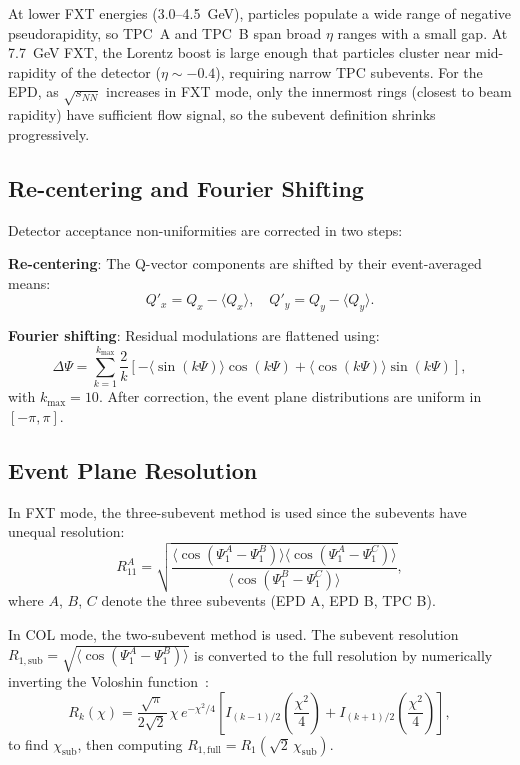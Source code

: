 \documentclass[aps,prc,preprint,superscriptaddress,nofootinbib]{revtex4-2}
\begin{document}
At lower FXT energies (3.0--4.5~GeV), particles populate a wide range of negative pseudorapidity, so TPC~A and TPC~B span broad $\eta$ ranges with a small gap. At 7.7~GeV FXT, the Lorentz boost is large enough that particles cluster near mid-rapidity of the detector ($\eta \sim -0.4$), requiring narrow TPC subevents. For the EPD, as $\sqrt{s_{NN}}$ increases in FXT mode, only the innermost rings (closest to beam rapidity) have sufficient flow signal, so the subevent definition shrinks progressively.

\subsection{Re-centering and Fourier Shifting}
\label{subsec:corrections}

Detector acceptance non-uniformities are corrected in two steps:

\textbf{Re-centering}: The Q-vector components are shifted by their event-averaged means:
\begin{equation}
    Q'_{x} = Q_x - \langle Q_x \rangle, \quad Q'_{y} = Q_y - \langle Q_y \rangle.
\end{equation}

\textbf{Fourier shifting}: Residual modulations are flattened using:
\begin{equation}
    \Delta\Psi = \sum_{k=1}^{k_{\max}} \frac{2}{k} \left[-\langle\sin(k\Psi)\rangle \cos(k\Psi) + \langle\cos(k\Psi)\rangle \sin(k\Psi)\right],
\end{equation}
with $k_{\max} = 10$. After correction, the event plane distributions are uniform in $[-\pi, \pi]$.

\subsection{Event Plane Resolution}
\label{subsec:resolution}

In FXT mode, the three-subevent method is used since the subevents have unequal resolution:
\begin{equation}
    R_{11}^A = \sqrt{\frac{\langle\cos(\Psi_1^A - \Psi_1^B)\rangle \langle\cos(\Psi_1^A - \Psi_1^C)\rangle}{\langle\cos(\Psi_1^B - \Psi_1^C)\rangle}},
    \label{eq:resolution_3sub}
\end{equation}
where $A$, $B$, $C$ denote the three subevents (EPD A, EPD B, TPC B).

In COL mode, the two-subevent method is used. The subevent resolution $R_{1,\text{sub}} = \sqrt{\langle\cos(\Psi_1^A - \Psi_1^B)\rangle}$ is converted to the full resolution by numerically inverting the Voloshin function~\cite{Poskanzer:1998yz}:
\begin{equation}
    R_k(\chi) = \frac{\sqrt{\pi}}{2\sqrt{2}}\,\chi\,e^{-\chi^2/4}\left[I_{(k-1)/2}\!\left(\frac{\chi^2}{4}\right) + I_{(k+1)/2}\!\left(\frac{\chi^2}{4}\right)\right],
\end{equation}
to find $\chi_{\text{sub}}$, then computing $R_{1,\text{full}} = R_1(\sqrt{2}\,\chi_{\text{sub}})$.
\end{document}
